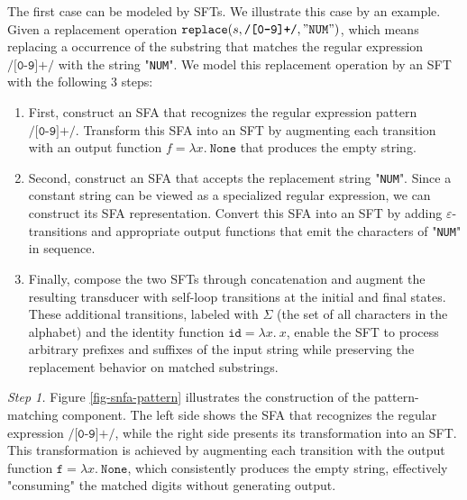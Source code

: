 \documentclass[sigplan,10pt,anonymous,review]{acmart}\settopmatter{printfolios=true,printccs=false,printacmref=false}
\begin{document}
The first case can be modeled by SFTs. We illustrate this case by an example. Given a replacement operation $\texttt{replace}\newline(s, \texttt{/[0-9]+/}, "\texttt{NUM}")$, which means replacing a occurrence of the substring that matches the regular expression $\texttt{/[0-9]+/}$ with the string "\texttt{NUM}".
We model this replacement operation by an SFT with the following 3 steps:

\begin{enumerate}
  \item First, construct an SFA that recognizes the regular expression pattern $\texttt{/[0-9]+/}$. Transform this SFA into an SFT by augmenting each transition with an output function $f = \lambda x.~\texttt{None}$ that produces the empty string. 
  \item Second, construct an SFA that accepts the replacement string "\texttt{NUM}". Since a constant string can be viewed as a specialized regular expression, we can construct its SFA representation. Convert this SFA into an SFT by adding $\varepsilon$-transitions  and appropriate output functions that emit the characters of "\texttt{NUM}" in sequence.
  \item Finally, compose the two SFTs through concatenation and augment the resulting transducer with self-loop transitions at the initial and final states. These additional transitions, labeled with $\Sigma$ (the set of all characters in the alphabet) and the identity function $\texttt{id}=\lambda x.~x$, enable the SFT to process arbitrary prefixes and suffixes of the input string while preserving the replacement behavior on matched substrings.
\end{enumerate}


\noindent\emph{Step 1.}
Figure \ref{fig-snfa-pattern} illustrates the construction of the pattern-matching component. The left side shows the SFA that recognizes the regular expression $\texttt{/[0-9]+/}$, while the right side presents its transformation into an SFT. This transformation is achieved by augmenting each transition with the output function $\texttt{f} = \lambda x.~\texttt{None}$, which consistently produces the empty string, effectively "consuming" the matched digits without generating output.
\end{document}
